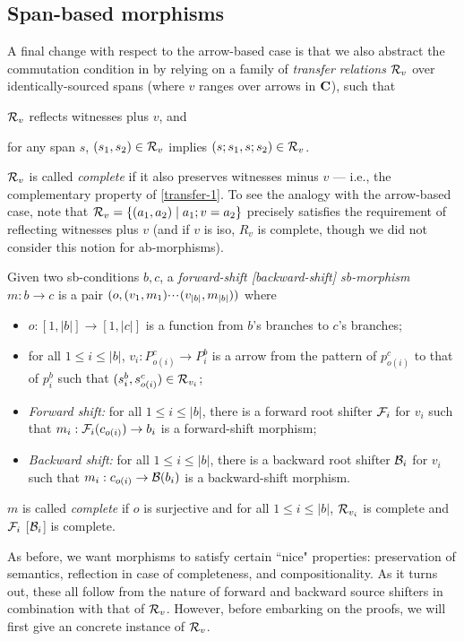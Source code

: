 \subsection{Span-based morphisms}

A final change with respect to the arrow-based case is that we also abstract the commutation condition in  by relying on a family of \emph{transfer relations} $\mathcal{R}_v$ over identically-sourced spans (where $v$ ranges over arrows in $\mathbf{C}$), such that
%
\begin{enumerate*}[label=\emph{\roman*}]
\item\label{transfer-1} $\mathcal{R}_v$ reflects witnesses plus $v$, and
\item\label{transfer-2} for any span $s$, $(s_1,s_2)\in \mathcal{R}_v$ implies $(s;s_1,s;s_2)\in \mathcal{R}_v$.
\end{enumerate*}
%
$\mathcal{R}_v$ is called \emph{complete} if it also preserves witnesses minus $v$ --- i.e., the complementary property of \ref{transfer-1}. To see the analogy with the arrow-based case, note that $\mathcal{R}_v=\{{(a_1,a_2)\mid a_1;v=a_2}\}$ precisely satisfies the requirement of reflecting witnesses plus $v$ (and if $v$ is iso, $R_v$ is complete, though we did not consider this notion for ab-morphisms).
%
\begin{definition}
  Given two sb-conditions $b,c$, a \emph{forward-shift [backward-shift] sb-morphism} $m:b\to c$ is a pair $(o,(v_1,m_1){\cdotp\mkern-2mu\cdotp\mkern-2mu\cdotp\mkern1mu} (v_{|b|},m_{|b|}))$ where
  \begin{itemize}
  \item $o:[1,|b|]\to [1,|c|]$ is a function from $b$'s branches to $c$'s branches;
  \item for all $1\leq i\leq |b|$, $v_i:P^c_{o(i)}\to P^b_i$ is a arrow from the pattern of $p^c_{o(i)}$ to that of $p^b_i$ such that $(s^b_i,s^c_{o(i)})\in \mathcal{R}_{v_i}$;
  \item \emph{Forward shift:} for all $1\leq i\leq |b|$, there is a forward root shifter $\mathcal{F}_i$ for $v_i$ such that $m_i:\mathcal{F}_i(c_{o(i)})\to b_i$ is a forward-shift morphism;
  \item \emph{Backward shift:} for all $1\leq i\leq |b|$, there is a backward root shifter $\mathcal{B}_i$ for $v_i$ such that $m_i:c_{o(i)}\to \mathcal{B}(b_i)$ is a backward-shift morphism.
  \end{itemize}
  $m$ is called \emph{complete} if $o$ is surjective and for all $1\leq i\leq |b|$, $\mathcal{R}_{v_i}$ is complete and $\mathcal{F}_i$ [$\mathcal{B}_i$] is complete.
\end{definition}
%
As before, we want morphisms to satisfy certain ``nice" properties: preservation of semantics, reflection in case of completeness, and compositionality. As it turns out, these all follow from the nature of forward and backward source shifters in combination with that of $\mathcal{R}_v$. However, before embarking on the proofs, we will first give an concrete instance of $\mathcal{R}_v$.



